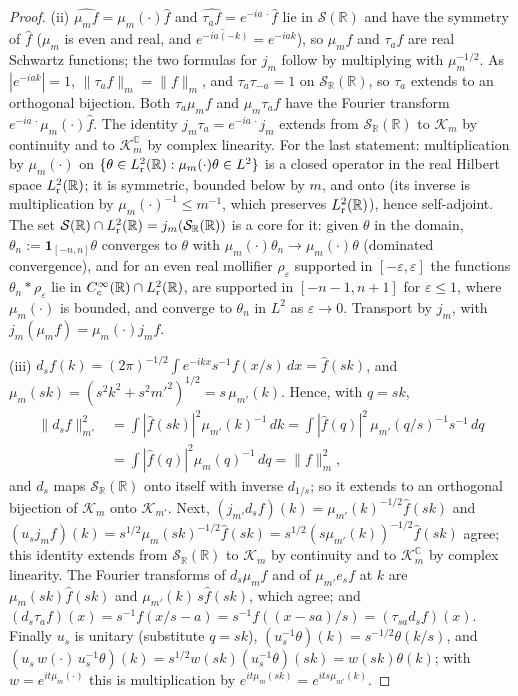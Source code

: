 \documentclass[11pt,a4paper]{article}
\theoremstyle{plain}
\theoremstyle{definition}
\theoremstyle{plain}
\theoremstyle{definition}
\newcommand{\R}{\mathbb{R}}
\newcommand{\C}{\mathbb{C}}
\begin{document}
\begin{proof}
(ii) $\widehat{\mu_mf}=\mu_m(\cdot)\hat f$ and $\widehat{\tau_af}=e^{-ia\,\cdot}\hat f$ lie in
$\mathcal S(\R)$ and have the symmetry of $\hat f$ ($\mu_m$ is even and real, and
$\overline{e^{-ia(-k)}}=e^{-iak}$), so $\mu_mf$ and $\tau_af$ are real Schwartz functions; the
two formulas for $j_m$ follow by multiplying with $\mu_m^{-1/2}$.  As $|e^{-iak}|=1$,
$\|\tau_af\|_m=\|f\|_m$, and $\tau_a\tau_{-a}=1$ on $\mathcal S_\R(\R)$, so $\tau_a$ extends to
an orthogonal bijection.  Both $\tau_a\mu_mf$ and $\mu_m\tau_af$ have the Fourier transform
$e^{-ia\,\cdot}\mu_m(\cdot)\hat f$.  The identity $j_m\tau_a=e^{-ia\,\cdot}j_m$ extends from
$\mathcal S_\R(\R)$ to $\mathcal K_m$ by continuity and to $\mathcal K_m^{\C}$ by complex
linearity.  For the last statement: multiplication by $\mu_m(\cdot)$ on
$\{\theta\in L^2_{\rm r}(\R):\mu_m(\cdot)\theta\in L^2\}$ is a closed operator in the real
Hilbert space $L^2_{\rm r}(\R)$; it is symmetric, bounded below by $m$, and onto (its inverse
is multiplication by $\mu_m(\cdot)^{-1}\le m^{-1}$, which preserves $L^2_{\rm r}(\R)$), hence
self-adjoint.  The set $\mathcal S(\R)\cap L^2_{\rm r}(\R)=j_m(\mathcal S_\R(\R))$ is a core
for it: given $\theta$ in the domain, $\theta_n:=\mathbf 1_{[-n,n]}\theta$ converges to
$\theta$ with $\mu_m(\cdot)\theta_n\to\mu_m(\cdot)\theta$ (dominated convergence), and for an
even real mollifier $\rho_\varepsilon$ supported in $[-\varepsilon,\varepsilon]$ the functions
$\theta_n*\rho_\varepsilon$ lie in $C_c^\infty(\R)\cap L^2_{\rm r}(\R)$, are supported in
$[-n-1,n+1]$ for $\varepsilon\le1$, where $\mu_m(\cdot)$ is bounded, and converge to
$\theta_n$ in $L^2$ as $\varepsilon\to0$.  Transport by $j_m$, with
$j_m(\mu_mf)=\mu_m(\cdot)j_mf$.

(iii) $\widehat{d_sf}(k)=(2\pi)^{-1/2}\int e^{-ikx}s^{-1}f(x/s)\,dx=\hat f(sk)$, and
$\mu_m(sk)=(s^2k^2+s^2m'^2)^{1/2}=s\,\mu_{m'}(k)$.  Hence, with $q=sk$,
\begin{align*}
 \|d_sf\|_{m'}^2&=\int|\hat f(sk)|^2\mu_{m'}(k)^{-1}\,dk=\int|\hat f(q)|^2\,\mu_{m'}(q/s)^{-1}s^{-1}\,dq\\
 &=\int|\hat f(q)|^2\mu_m(q)^{-1}\,dq=\|f\|_m^2 ,
\end{align*}
and $d_s$ maps $\mathcal S_\R(\R)$ onto itself with inverse $d_{1/s}$; so it extends to an
orthogonal bijection of $\mathcal K_m$ onto $\mathcal K_{m'}$.  Next,
$(j_{m'}d_sf)(k)=\mu_{m'}(k)^{-1/2}\hat f(sk)$ and $(u_sj_mf)(k)=s^{1/2}\mu_m(sk)^{-1/2}\hat f(sk)=
s^{1/2}(s\mu_{m'}(k))^{-1/2}\hat f(sk)$ agree; this identity extends from $\mathcal S_\R(\R)$ to
$\mathcal K_m$ by continuity and to $\mathcal K_m^{\C}$ by complex linearity.  The Fourier
transforms of $d_s\mu_mf$ and of
$\mu_{m'}e_sf$ at $k$ are $\mu_m(sk)\hat f(sk)$ and $\mu_{m'}(k)\,s\hat f(sk)$, which agree; and
$(d_s\tau_af)(x)=s^{-1}f(x/s-a)=s^{-1}f((x-sa)/s)=(\tau_{sa}d_sf)(x)$.  Finally $u_s$ is
unitary (substitute $q=sk$), $(u_s^{-1}\theta)(k)=s^{-1/2}\theta(k/s)$, and
$(u_s\,w(\cdot)\,u_s^{-1}\theta)(k)=s^{1/2}w(sk)(u_s^{-1}\theta)(sk)=w(sk)\theta(k)$; with
$w=e^{it\mu_m(\cdot)}$ this is multiplication by $e^{it\mu_m(sk)}=e^{its\mu_{m'}(k)}$.
\end{proof}
\end{document}
